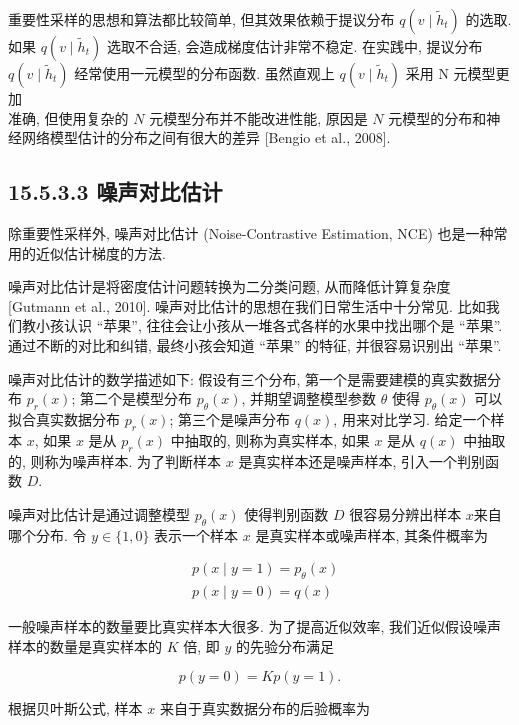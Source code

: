 \documentclass[10pt]{article}
\begin{document}
重要性采样的思想和算法都比较简单, 但其效果依赖于提议分布 $q\left(v \mid \tilde{h}_{t}\right)$ 的选取. 如果 $q\left(v \mid \tilde{h}_{t}\right)$ 选取不合适, 会造成梯度估计非常不稳定. 在实践中, 提议分布 $q\left(v \mid \tilde{h}_{t}\right)$ 经常使用一元模型的分布函数. 虽然直观上 $q\left(v \mid \tilde{h}_{t}\right)$ 采用 $\mathrm{N}$ 元模型更加\\
准确, 但使用复杂的 $N$ 元模型分布并不能改进性能, 原因是 $N$ 元模型的分布和神经网络模型估计的分布之间有很大的差异 [Bengio et al., 2008].

\subsection*{15.5.3.3 噪声对比估计}
除重要性采样外, 噪声对比估计 (Noise-Contrastive Estimation, NCE) 也是一种常用的近似估计梯度的方法.

噪声对比估计是将密度估计问题转换为二分类问题, 从而降低计算复杂度 [Gutmann et al., 2010]. 噪声对比估计的思想在我们日常生活中十分常见. 比如我们教小孩认识 “苹果”, 往往会让小孩从一堆各式各样的水果中找出哪个是 “苹果”. 通过不断的对比和纠错, 最终小孩会知道 “苹果” 的特征, 并很容易识别出 “苹果”.

噪声对比估计的数学描述如下: 假设有三个分布, 第一个是需要建模的真实数据分布 $p_{r}(x)$; 第二个是模型分布 $p_{\theta}(x)$, 并期望调整模型参数 $\theta$ 使得 $p_{\theta}(x)$ 可以拟合真实数据分布 $p_{r}(x)$; 第三个是噪声分布 $q(x)$, 用来对比学习. 给定一个样本 $x$, 如果 $x$ 是从 $p_{r}(x)$ 中抽取的, 则称为真实样本, 如果 $x$ 是从 $q(x)$ 中抽取的, 则称为噪声样本. 为了判断样本 $x$ 是真实样本还是噪声样本, 引入一个判别函数 $D$.

噪声对比估计是通过调整模型 $p_{\theta}(x)$ 使得判别函数 $D$ 很容易分辨出样本 $x$来自哪个分布. 令 $y \in\{1,0\}$ 表示一个样本 $x$ 是真实样本或噪声样本, 其条件概率为


\begin{align*}
& p(x \mid y=1)=p_{\theta}(x)  \tag{15.81}\\
& p(x \mid y=0)=q(x) \tag{15.82}
\end{align*}


一般噪声样本的数量要比真实样本大很多. 为了提高近似效率, 我们近似假设噪声样本的数量是真实样本的 $K$ 倍, 即 $y$ 的先验分布满足


\begin{equation*}
p(y=0)=K p(y=1) . \tag{15.83}
\end{equation*}


根据贝叶斯公式, 样本 $x$ 来自于真实数据分布的后验概率为
\end{document}

